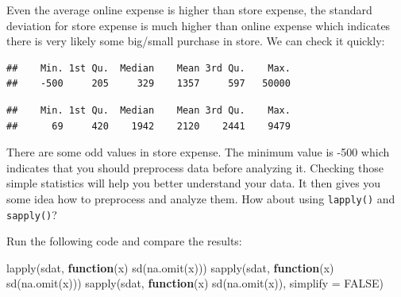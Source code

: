\documentclass[
  12pt,
]{krantz}
\makeatletter
\newenvironment{Shaded}{\begin{snugshade}}{\end{snugshade}}
\newcommand{\AttributeTok}[1]{\textcolor[rgb]{0.61,0.61,0.61}{#1}}
\newcommand{\ConstantTok}[1]{\textcolor[rgb]{0,0,0}{#1}}
\newcommand{\ControlFlowTok}[1]{\textcolor[rgb]{0.27,0.27,0.27}{\textbf{#1}}}
\newcommand{\FunctionTok}[1]{\textcolor[rgb]{0,0,0}{#1}}
\newcommand{\NormalTok}[1]{#1}
\newcommand{\SpecialCharTok}[1]{\textcolor[rgb]{0,0,0}{#1}}
\newenvironment{kframe}{%
\medskip{}
\setlength{\fboxsep}{.8em}
 \def\at@end@of@kframe{}%
 \ifinner\ifhmode%
  \def\at@end@of@kframe{\end{minipage}}%
  \begin{minipage}{\columnwidth}%
 \fi\fi%
 \def\FrameCommand##1{\hskip\@totalleftmargin \hskip-\fboxsep
 \colorbox{shadecolor}{##1}\hskip-\fboxsep
     \hskip-\linewidth \hskip-\@totalleftmargin \hskip\columnwidth}%
 \MakeFramed {\advance\hsize-\width
   \@totalleftmargin\z@ \linewidth\hsize
   \@setminipage}}%
 {\par\unskip\endMakeFramed%
 \at@end@of@kframe}
\renewenvironment{Shaded}{\begin{kframe}}{\end{kframe}}
\makeatother
\begin{document}
Even the average online expense is higher than store expense, the standard deviation for store expense is much higher than online expense which indicates there is very likely some big/small purchase in store. We can check it quickly:

\begin{Shaded}
\end{Shaded}

\begin{verbatim}
##    Min. 1st Qu.  Median    Mean 3rd Qu.    Max. 
##    -500     205     329    1357     597   50000
\end{verbatim}

\begin{Shaded}
\end{Shaded}

\begin{verbatim}
##    Min. 1st Qu.  Median    Mean 3rd Qu.    Max. 
##      69     420    1942    2120    2441    9479
\end{verbatim}

There are some odd values in store expense. The minimum value is -500 which indicates that you should preprocess data before analyzing it. Checking those simple statistics will help you better understand your data. It then gives you some idea how to preprocess and analyze them. How about using \texttt{lapply()} and \texttt{sapply()}?

Run the following code and compare the results:

\begin{Shaded}
\begin{Highlighting}[]
\FunctionTok{lapply}\NormalTok{(sdat, }\ControlFlowTok{function}\NormalTok{(x) }\FunctionTok{sd}\NormalTok{(}\FunctionTok{na.omit}\NormalTok{(x)))}
\FunctionTok{sapply}\NormalTok{(sdat, }\ControlFlowTok{function}\NormalTok{(x) }\FunctionTok{sd}\NormalTok{(}\FunctionTok{na.omit}\NormalTok{(x)))}
\FunctionTok{sapply}\NormalTok{(sdat, }\ControlFlowTok{function}\NormalTok{(x) }\FunctionTok{sd}\NormalTok{(}\FunctionTok{na.omit}\NormalTok{(x)), }\AttributeTok{simplify =} \ConstantTok{FALSE}\NormalTok{)}
\end{Highlighting}
\end{Shaded}
\end{document}
